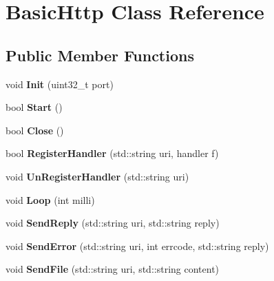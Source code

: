 \hypertarget{classBasicHttp}{
\section{BasicHttp Class Reference}
\label{classBasicHttp}
}
\subsection*{Public Member Functions}
\begin{DoxyCompactItemize}
\item 
\hypertarget{classBasicHttp_ad5c0909c854486aecf71377073b72b42}{
void {\bfseries Init} (uint32\_\-t port)}
\label{classBasicHttp_ad5c0909c854486aecf71377073b72b42}

\item 
\hypertarget{classBasicHttp_a06aaed65f80fd9b0209625426213d1cd}{
bool {\bfseries Start} ()}
\label{classBasicHttp_a06aaed65f80fd9b0209625426213d1cd}

\item 
\hypertarget{classBasicHttp_a181cda3b0a709ca2eb6711467a0c4dd1}{
bool {\bfseries Close} ()}
\label{classBasicHttp_a181cda3b0a709ca2eb6711467a0c4dd1}

\item 
\hypertarget{classBasicHttp_a2c4a7caafebed81fd7aefeba17c1e00f}{
bool {\bfseries RegisterHandler} (std::string uri, handler f)}
\label{classBasicHttp_a2c4a7caafebed81fd7aefeba17c1e00f}

\item 
\hypertarget{classBasicHttp_ac1480a1d4a5b95698f038a16170e5bfe}{
void {\bfseries UnRegisterHandler} (std::string uri)}
\label{classBasicHttp_ac1480a1d4a5b95698f038a16170e5bfe}

\item 
\hypertarget{classBasicHttp_abf7d6301ebf41b645f178c97372ea256}{
void {\bfseries Loop} (int milli)}
\label{classBasicHttp_abf7d6301ebf41b645f178c97372ea256}

\item 
\hypertarget{classBasicHttp_a2c064a0d882f5536f16147cdc3149130}{
void {\bfseries SendReply} (std::string uri, std::string reply)}
\label{classBasicHttp_a2c064a0d882f5536f16147cdc3149130}

\item 
\hypertarget{classBasicHttp_a13b165fa4e5a037535bd434ad337bc50}{
void {\bfseries SendError} (std::string uri, int errcode, std::string reply)}
\label{classBasicHttp_a13b165fa4e5a037535bd434ad337bc50}

\item 
\hypertarget{classBasicHttp_ac839bb0cea5e68734d47d0d475c64b2a}{
void {\bfseries SendFile} (std::string uri, std::string content)}
\label{classBasicHttp_ac839bb0cea5e68734d47d0d475c64b2a}

\end{DoxyCompactItemize}
